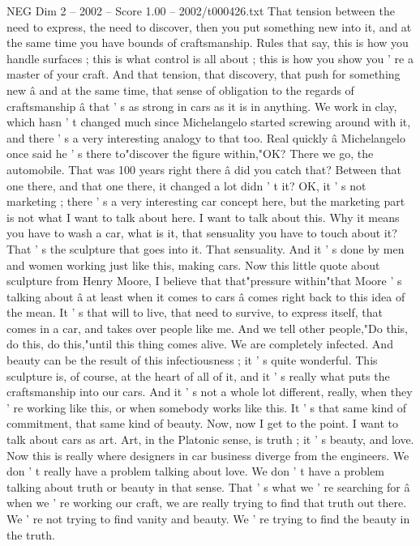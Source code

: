 \begin{textsample}{NEG Dim 2 – 2002 – Score 1.00 – 2002/t000426.txt}
That tension between the need to express, the need to discover, then you put something new into it, and at the same time you have bounds of craftsmanship.
Rules that say, this is how you handle surfaces ; this is what control is all about ; this is how you show you ' re a master of your craft.
And that tension, that discovery, that push for something new â and at the same time, that sense of obligation to the regards of craftsmanship â that ' s as strong in cars as it is in anything.
We work in clay, which hasn ' t changed much since Michelangelo started screwing around with it, and there ' s a very interesting analogy to that too.
Real quickly â Michelangelo once said he ' s there to"discover the figure within,"OK?
There we go, the automobile.
That was 100 years right there â did you catch that?
Between that one there, and that one there, it changed a lot didn ' t it?
OK, it ' s not marketing ; there ' s a very interesting car concept here, but the marketing part is not what I want to talk about here.
I want to talk about this.
Why it means you have to wash a car, what is it, that sensuality you have to touch about it?
That ' s the sculpture that goes into it.
That sensuality.
And it ' s done by men and women working just like this, making cars.
Now this little quote about sculpture from Henry Moore, I believe that that"pressure within"that Moore ' s talking about â at least when it comes to cars â comes right back to this idea of the mean.
It ' s that will to live, that need to survive, to express itself, that comes in a car, and takes over people like me.
And we tell other people,"Do this, do this, do this,"until this thing comes alive.
We are completely infected.
And beauty can be the result of this infectiousness ; it ' s quite wonderful.
This sculpture is, of course, at the heart of all of it, and it ' s really what puts the craftsmanship into our cars.
And it ' s not a whole lot different, really, when they ' re working like this, or when somebody works like this.
It ' s that same kind of commitment, that same kind of beauty.
Now, now I get to the point.
I want to talk about cars as art.
Art, in the Platonic sense, is truth ; it ' s beauty, and love.
Now this is really where designers in car business diverge from the engineers.
We don ' t really have a problem talking about love.
We don ' t have a problem talking about truth or beauty in that sense.
That ' s what we ' re searching for â when we ' re working our craft, we are really trying to find that truth out there.
We ' re not trying to find vanity and beauty.
We ' re trying to find the beauty in the truth.

\end{textsample}
